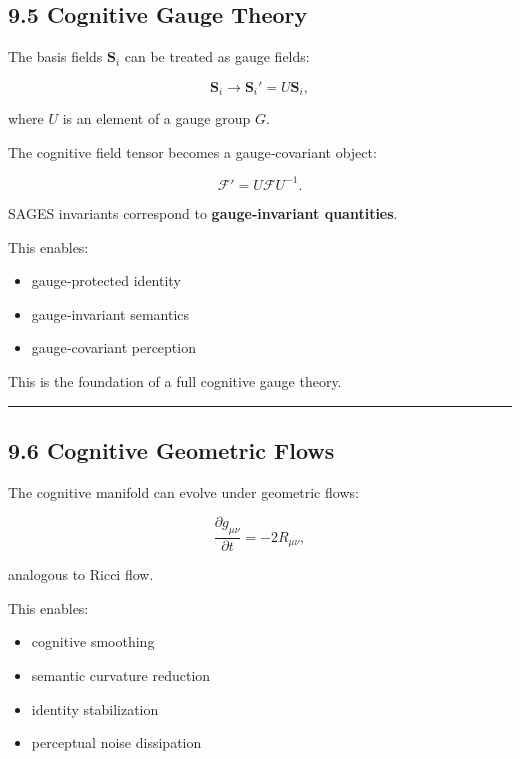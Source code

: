 \subsection{9.5 Cognitive Gauge Theory}\label{cognitive-gauge-theory}

The basis fields \(\mathbf{S}_i\) can be treated as gauge fields:

\[
\mathbf{S}_i \rightarrow \mathbf{S}_i' = U \mathbf{S}_i,
\]

where \(U\) is an element of a gauge group \(G\).

The cognitive field tensor becomes a gauge‑covariant object:

\[
\mathcal{F}' = U \mathcal{F} U^{-1}.
\]

SAGES invariants correspond to \textbf{gauge‑invariant quantities}.

This enables:

\begin{itemize}
\tightlist
\item
  gauge‑protected identity\\
\item
  gauge‑invariant semantics\\
\item
  gauge‑covariant perception
\end{itemize}

This is the foundation of a full cognitive gauge theory.

\begin{center}\rule{0.5\linewidth}{0.5pt}\end{center}

\subsection{9.6 Cognitive Geometric Flows}\label{cognitive-geometric-flows}

The cognitive manifold can evolve under geometric flows:

\[
\frac{\partial g_{\mu\nu}}{\partial t} = -2 R_{\mu\nu},
\]

analogous to Ricci flow.

This enables:

\begin{itemize}
\tightlist
\item
  cognitive smoothing\\
\item
  semantic curvature reduction\\
\item
  identity stabilization\\
\item
  perceptual noise dissipation
\end{itemize}

